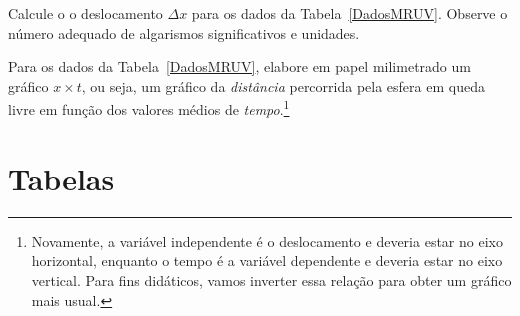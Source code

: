 \begin{question}[type={exam}]{1}
Calcule o o deslocamento $\Delta x$ para os dados da Tabela~\ref{DadosMRUV}. Observe o número adequado de algarismos significativos e unidades.
\end{question}

\begin{question}[type={exam}]{2}
Para os dados da Tabela~\ref{DadosMRUV}, elabore em papel milimetrado um gráfico $x \times t$, ou seja, um gráfico da \emph{distância} percorrida pela esfera em queda livre em função dos valores médios de \emph{tempo}.\footnote{Novamente, a variável independente é o deslocamento e deveria estar no eixo horizontal, enquanto o tempo é a variável dependente e deveria estar no eixo vertical. Para fins didáticos, vamos inverter essa relação para obter um gráfico mais usual.}
\end{question}
\vfill
\pagebreak
\section{Tabelas}

